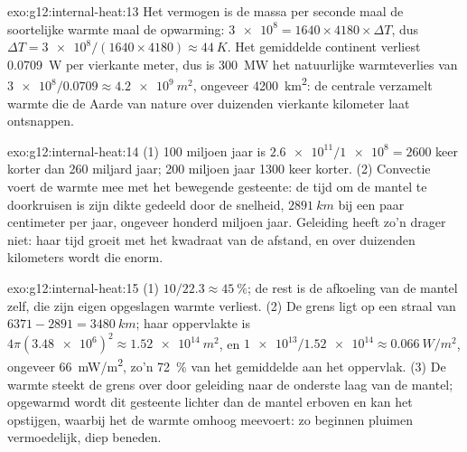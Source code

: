 \begin{solution}{exo:g12:internal-heat:13}
Het vermogen is de massa per seconde maal de soortelijke warmte maal de
opwarming: $\num{3e8} = 1640 \times 4180 \times \Delta T$, dus $\Delta T =
\num{3e8}/(1640 \times 4180) \approx \qty{44}{K}$. Het gemiddelde continent verliest
\qty{0.0709}{W} per vierkante meter, dus is \qty{300}{MW} het natuurlijke warmteverlies
van $\num{3e8}/0.0709 \approx \qty{4.2e9}{m^2}$, ongeveer \qty{4200}{km^2}:
de centrale verzamelt warmte die de Aarde van nature over duizenden
vierkante kilometer laat ontsnappen.
\end{solution}

\begin{solution}{exo:g12:internal-heat:14}
(1) 100 miljoen jaar is $\num{2.6e11}/\num{1e8} = 2600$ keer
korter dan 260 miljard jaar; 200 miljoen jaar 1300 keer korter.
(2) Convectie voert de warmte mee met het bewegende gesteente: de tijd om de
mantel te doorkruisen is zijn dikte gedeeld door de snelheid, $\qty{2891}{km}$ bij een paar
centimeter per jaar, ongeveer honderd miljoen jaar. Geleiding heeft zo'n
drager niet: haar tijd groeit met het kwadraat van de afstand, en over duizenden
kilometers wordt die enorm.
\end{solution}

\begin{solution}{exo:g12:internal-heat:15}
(1) $10/22.3 \approx \qty{45}{\percent}$; de rest is de afkoeling van de
mantel zelf, die zijn eigen opgeslagen warmte verliest. (2) De grens ligt op een straal van $6371 - 2891 =
\qty{3480}{km}$; haar oppervlakte is $4\pi (\num{3.48e6})^2 \approx
\qty{1.52e14}{m^2}$, en $\num{1e13}/\num{1.52e14} \approx
\qty{0.066}{W/m^2}$, ongeveer \qty{66}{mW/m^2}, zo'n \qty{72}{\percent} van het
gemiddelde aan het oppervlak. (3) De warmte steekt de grens over door geleiding naar
de onderste laag van de mantel; opgewarmd wordt dit gesteente lichter dan de
mantel erboven en kan het opstijgen, waarbij het de warmte omhoog meevoert: zo
beginnen pluimen vermoedelijk, diep beneden.
\end{solution}

